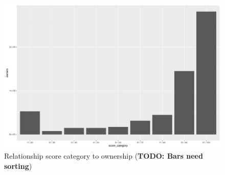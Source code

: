\begin{figure}[!t]
	\centering
	\includegraphics[width=1.0\columnwidth]{images/rel-score-category-owners.pdf}
	\caption{Relationship score category to ownership (\textbf{TODO: Bars need sorting})}
\label{fig:rel-score-category-owners}
\end{figure}

